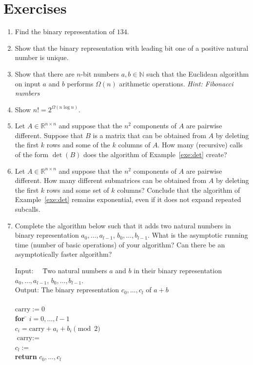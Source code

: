 \section*{Exercises} 


\begin{enumerate}
\item Find the binary representation of $134$. 
\item Show that the binary representation with leading bit one of a positive natural number is
 unique. \label{alg:ex2}
\item Show that there are $n$-bit numbers $a,b ∈ ℕ$ such that the  Euclidean algorithm on input $a$ and $b$ performs  $\Omega(n)$ arithmetic operations. \emph{Hint: Fibonacci numbers} 
\item Show $n! =  2^{\Omega({n \log n})}$. 
\item 
Let $A ∈ ℝ^{n ×n}$  and suppose that the $n^2$ components of $A$ are pairwise different.
Suppose that $B$ is a matrix that can be obtained from $A$ by deleting the first $k$ rows and some of the $k$ columns of $A$. How many (recursive) calls of the form $\det(B)$ does the algorithm of Example~\ref{exe:det} create? 
\item Let $A ∈ ℝ^{n ×n}$  and suppose that the $n^2$ components of $A$ are pairwise different. How many different submatrices can be obtained from $A$ by deleting the first $k$ rows and some set of $k$ columns? Conclude that the algorithm  of Example~\ref{exe:det} remains exponential, even if it does not expand repeated subcalls. 
\item Complete the  algorithm below such  that it adds two natural numbers  in binary representation  $a_0,\dots,a_{l-1}$,  $b_0,\dots,b_{l-1}$. What is the asymptotic running time (number of basic operations) of your algorithm? Can there be an asymptotically  faster algorithm? 

  \begin{tabbing}
    Input:~~ \= Two natural numbers $a$ and $b$  in their binary representation\\ 
    \>   $a_0,\dots,a_{l-1}$, $b_0,\dots,b_{l-1}$. \\
    Output: \> The binary representation $c_0,\dots,c_l$ of $a+b$ \\
\pushtabs 	
\\
   $\mathrm{carry} := 0$ \\
   {\bf for} \= $i=0, \dots, l-1$ \\
             \> $c_i = \mathrm{carry} + a_i + b_i \pmod{2} $\\
             \> $\mbox{carry} := $ \\
   $c_l := $  \\
   {\bf return} $c_0,\dots ,c_l$ \\   
\poptabs
  \end{tabbing}

\end{enumerate}

